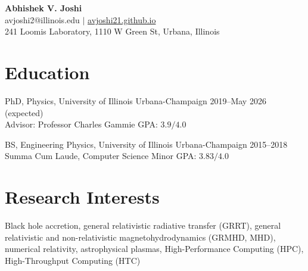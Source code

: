 \documentclass[11pt]{article}
\begin{document}
\begin{center}
{\Large \bfseries Abhishek V. Joshi}\\\vspace{0.5em}
avjoshi2@illinois.edu $|$ \href{https://avjoshi21.github.io}{avjoshi21.github.io} \\\vspace{0.25em} 241 Loomis Laboratory, 1110 W Green St, Urbana, Illinois
\end{center}

\section*{Education}
PhD, Physics, University of Illinois Urbana-Champaign \hfill 2019--May 2026 (expected)\\
Advisor: Professor Charles Gammie  \hfill {\normalsize GPA: $3.9/4.0$}


BS, Engineering Physics, University of Illinois Urbana-Champaign \hfill 2015--2018\\
{\normalsize Summa Cum Laude, Computer Science Minor} {\hfill GPA: $3.83/4.0$}


\section*{Research Interests}
Black hole accretion, general relativistic radiative transfer (GRRT), general relativistic and non-relativistic magnetohydrodynamics (GRMHD, MHD), numerical relativity, astrophysical plasmas, High-Performance Computing (HPC), High-Throughput Computing (HTC)   
\end{document}
